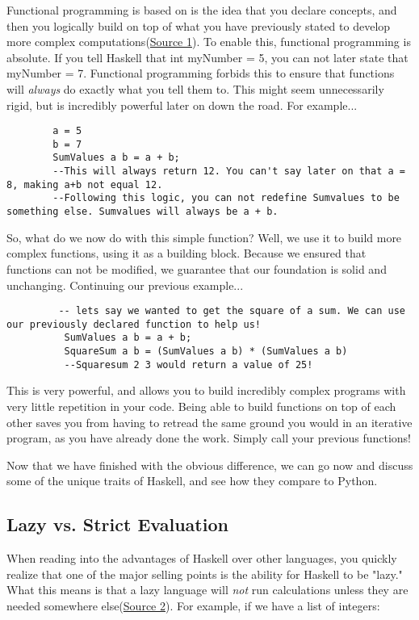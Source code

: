 \documentclass{article}
\begin{document}
    \medskip\noindent Functional programming is based on is the idea that you declare concepts, and then you logically build on top of what you have previously stated to develop more complex computations(\href {http://learnyouahaskell.com/introduction}{Source 1}). To enable this, functional programming is absolute. If you tell Haskell that int myNumber = 5, you can not later state that myNumber = 7. Functional programming forbids this to ensure that functions will \textit{always} do exactly what you tell them to. This might seem unnecessarily rigid, but is incredibly powerful later on down the road. For example...
        \begin{lstlisting}
        a = 5
        b = 7
        SumValues a b = a + b; 
        --This will always return 12. You can't say later on that a = 8, making a+b not equal 12. 
        --Following this logic, you can not redefine Sumvalues to be something else. Sumvalues will always be a + b. 
        \end{lstlisting}
        
    \medskip\noindent So, what do we now do with this simple function? Well, we use it to build more complex functions, using it as a building block. Because we ensured that functions can not be modified, we guarantee that our foundation is solid and unchanging. Continuing our previous example...
        \begin{lstlisting}
         -- lets say we wanted to get the square of a sum. We can use our previously declared function to help us! 
          SumValues a b = a + b;
          SquareSum a b = (SumValues a b) * (SumValues a b)
          --Squaresum 2 3 would return a value of 25!
        \end{lstlisting}
    \medskip\noindent This is very powerful, and allows you to build incredibly complex programs with very little repetition in your code. Being able to build functions on top of each other saves you from having to retread the same ground you would in an iterative program, as you have already done the work. Simply call your previous functions!
    
    \medskip
     \medskip\noindent Now that we have finished with the obvious difference, we can go now and discuss some of the unique traits of Haskell, and see how they compare to Python. 
     
    \subsection{Lazy vs. Strict Evaluation}
    When reading into the advantages of Haskell over other languages, you quickly realize that one of the major selling points is the ability for Haskell to be "lazy." What this means is that a lazy language will \textit{not} run calculations unless they are needed somewhere else(\href {https://towardsdatascience.com/what-is-lazy-evaluation-in-python-9efb1d3bfed0}{Source 2}). For example, if we have a list of integers: 
\end{document}
